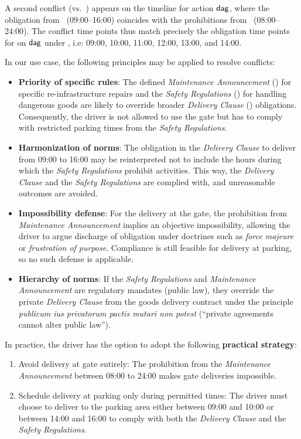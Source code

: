 A second conflict (\DC vs.~\MA) appears on the timeline for action $\mathsf{dag}$, where the obligation from \DC\ (09{:}00–16{:}00) coincides with the prohibitions from \MA\ (08{:}00–24{:}00). 
The conflict time points thus match precisely the obligation time points for on $\mathsf{dag}$ under \DC, i.e: 09:00, 10:00, 11:00, 12:00, 13:00, and 14:00.

In our use case, %
the following principles may be applied to resolve conflicts:
\begin{itemize}
    \item \textbf{Priority of specific rules}: 
    The defined \textit{Maintenance Announcement} (\MA) for specific re-infrastructure repairs and the \textit{Safety Regulations} (\SR) for handling dangerous goods are likely to override broader \textit{Delivery Clause} (\DC) obligations. Consequently, the driver is not allowed to use the gate but has to comply with restricted parking times from the \textit{Safety Regulations}. 

    \item \textbf{Harmonization of norms}: 
    The obligation in the \textit{Delivery Clause} to deliver from 09:00 to 16:00 may be reinterpreted not to include the hours during which the \textit{Safety Regulations} prohibit activities. This way, the \textit{Delivery Clause} and the \textit{Safety Regulations} are complied with, and unreasonable outcomes are avoided.
    
    \item \textbf{Impossibility defense}: For the delivery at the gate, the prohibition from \textit{Maintenance Announcement} implies an objective impossibility, allowing the driver to argue discharge of obligation under doctrines such as \textit{force majeure} or \textit{frustration of purpose}. Compliance is still feasible for delivery at parking, so no such defense is applicable.
    \item \textbf{Hierarchy of norms}: If the \textit{Safety Regulations} and \textit{Maintenance Announcement} are regulatory mandates (public law), they override the private \textit{Delivery Clause} from the goods delivery contract under the principle \textit{publicum ius privatorum pactis mutari non potest} (“private agreements cannot alter public law”).
\end{itemize}

In practice, the driver has the option to adopt the following \textbf{practical strategy}:


\begin{enumerate}
     \item Avoid delivery at gate entirely: The prohibition from the \textit{Maintenance Announcement} between 08:00 to 24:00 makes gate deliveries impossible. 
    \item Schedule delivery at parking only during permitted times: The driver must choose to deliver to the parking area either between 09:00 and 10:00 or between 14:00 and 16:00 to comply with both the \textit{Delivery Clause} and the \textit{Safety Regulations}.
\end{enumerate}

